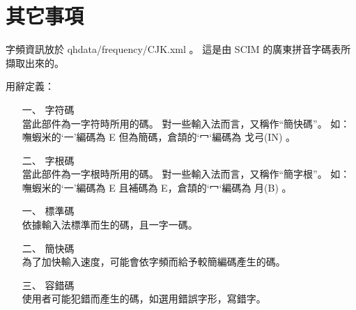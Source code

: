 \chapter{其它事項}
字頻資訊放於 qhdata/frequency/CJK.xml 。
這是由 SCIM 的廣東拼音字碼表所擷取出來的。


用辭定義：
\begin{enumerate}
\item[一、]字符碼\\
當此部件為一字符時所用的碼。
對一些輸入法而言，又稱作``簡快碼''。
如：嘸蝦米的`一'編碼為 E 但為簡碼，倉頡的`冖‘編碼為 戈弓(IN) 。
\item[二、]字根碼\\
當此部件為一字根時所用的碼。
對一些輸入法而言，又稱作``簡字根''。
如：嘸蝦米的`一'編碼為 E 且補碼為 E，倉頡的`冖‘編碼為 月(B) 。
\end{enumerate}

\begin{enumerate}
\item[一、]標準碼\\
依據輸入法標準而生的碼，且一字一碼。
\item[二、]簡快碼\\
為了加快輸入速度，可能會依字頻而給予較簡編碼產生的碼。 
\item[三、]容錯碼\\
使用者可能犯錯而產生的碼，如選用錯誤字形，寫錯字。
\end{enumerate}

